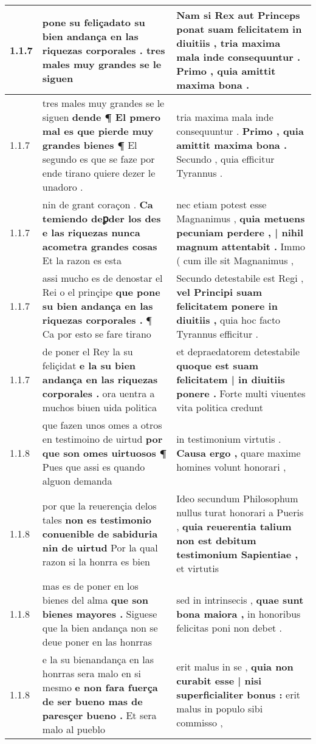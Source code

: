 \begin{tabular}{|p{1cm}|p{6.5cm}|p{6.5cm}|}
1.1.7 & pone su \textbf{ feliçadato su bien andança en las riquezas corporales . } tres males muy grandes se le siguen & Nam si Rex aut Princeps ponat suam felicitatem in diuitiis , \textbf{ tria maxima mala inde consequuntur . } Primo , quia amittit maxima bona . \\\hline
1.1.7 & tres males muy grandes se le siguen \textbf{ dende ¶ El pmero mal es que pierde muy grandes bienes ¶ } El segundo es que se faze por ende tirano quiere dezer le unadoro . & tria maxima mala inde consequuntur . \textbf{ Primo , quia amittit maxima bona . } Secundo , quia efficitur Tyrannus . \\\hline
1.1.7 & nin de grant coraçon . \textbf{ Ca temiendo deꝑder los des e las riquezas nunca acometra grandes cosas } Et la razon es esta & nec etiam potest esse Magnanimus , \textbf{ quia metuens pecuniam perdere , | nihil magnum attentabit . } Immo ( cum ille sit Magnanimus , \\\hline
1.1.7 & assi mucho es de denostar el Rei o el prinçipe \textbf{ que pone su bien andança en las riquezas corporales . } ¶ Ca por esto se fare tirano & Secundo detestabile est Regi , \textbf{ vel Principi suam felicitatem ponere in diuitiis , } quia hoc facto Tyrannus efficitur . \\\hline
1.1.7 & de poner el Rey la su feliçidat \textbf{ e la su bien andança en las riquezas corporales . } ora uentra a muchos biuen uida politica & et depraedatorem detestabile \textbf{ quoque est suam felicitatem | in diuitiis ponere . } Forte multi viuentes vita politica credunt \\\hline
1.1.8 & que fazen unos omes a otros en testimoino de uirtud \textbf{ por que son omes uirtuosos ¶ } Pues que assi es quando alguon demanda & in testimonium virtutis . \textbf{ Causa ergo , } quare maxime homines volunt honorari , \\\hline
1.1.8 & por que la reuerençia delos tales \textbf{ non es testimonio conuenible de sabiduria nin de uirtud } Por la qual razon si la honrra es bien & Ideo secundum Philosophum nullus turat honorari a Pueris , \textbf{ quia reuerentia talium non est debitum testimonium Sapientiae , } et virtutis \\\hline
1.1.8 & mas es de poner en los bienes del alma \textbf{ que son bienes mayores . } Siguese que la bien andança non se deue poner en las honrras & sed in intrinsecis , \textbf{ quae sunt bona maiora , } in honoribus felicitas poni non debet . \\\hline
1.1.8 & e la su bienandança en las honrras sera malo en si mesmo \textbf{ e non fara fuerça de ser bueno mas de paresçer bueno . } Et sera malo al pueblo & erit malus in se , \textbf{ quia non curabit esse | nisi superficialiter bonus : } erit malus in populo sibi commisso , \\\hline

\end{tabular}
